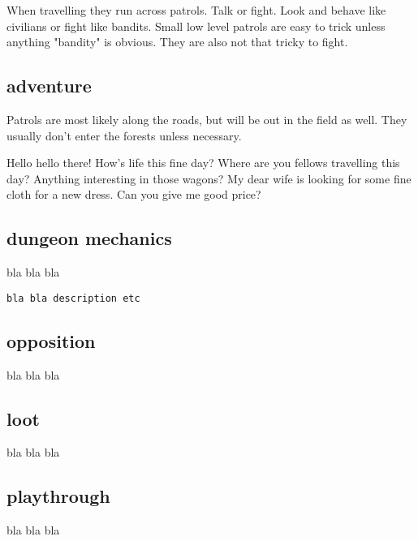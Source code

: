 When travelling they run across patrols. Talk or fight. Look and behave like civilians or fight like bandits. Small low level patrols are easy to trick unless anything "bandity" is obvious. They are also not that tricky to fight.


\subsection*{adventure}

Patrols are most likely along the roads, but will be out in the field as well. They usually don't enter the forests unless necessary.

\begin{readoutloud}
Hello hello there! How's life this fine day? Where are you fellows travelling this day? Anything interesting in those wagons? My dear wife is looking for some fine cloth for a new dress. Can you give me good price?
\end{readoutloud}


\subsection*{dungeon mechanics}

bla bla bla

\small \begin{verbatim}
bla bla description etc
\end{verbatim} \normalsize


\subsection*{opposition}

bla bla bla


\subsection*{loot}

bla bla bla


\subsection*{playthrough}

bla bla bla










\newpage
